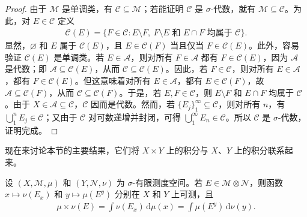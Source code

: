 \documentclass[../../main.tex]{subfiles}%
\begin{document}
\begin{proof}
由于 $\mathscr{M}$ 是单调类，有 $\mathscr{C}\subseteq\mathscr{M}$；若能证明 $\mathscr{C}$ 是 $\sigma$-代数，就有 $\mathscr{M}\subseteq\mathscr{C}$。为此，对 $E\in\mathscr{C}$ 定义
\begin{align*}
\mathscr{C}(E)=\{F\in\mathscr{C}:E\setminus F,\ F\setminus E\text{ 和 }E\cap F\text{ 均属于 }\mathscr{C}\}.
\end{align*}
显然，$\varnothing$ 和 $E$ 属于 $\mathscr{C}(E)$，且 $E\in\mathscr{C}(F)$ 当且仅当 $F\in\mathscr{C}(E)$。此外，容易验证 $\mathscr{C}(E)$ 是单调类。若 $E\in\mathscr{A}$，则对所有 $F\in\mathscr{A}$ 都有 $F\in\mathscr{C}(E)$，因为 $\mathscr{A}$ 是代数；即 $\mathscr{A}\subseteq\mathscr{C}(E)$，从而 $\mathscr{C}\subseteq\mathscr{C}(E)$。因此，若 $F\in\mathscr{C}$，则对所有 $E\in\mathscr{A}$，都有 $F\in\mathscr{C}(E)$。但这意味着对所有 $E\in\mathscr{A}$，都有 $E\in\mathscr{C}(F)$，故 $\mathscr{A}\subseteq\mathscr{C}(F)$，从而 $\mathscr{C}\subseteq\mathscr{C}(F)$。于是，若 $E,F\in\mathscr{C}$，则 $E\setminus F$ 和 $E\cap F$ 均属于 $\mathscr{C}$。由于 $X\in\mathscr{A}\subseteq\mathscr{C}$，$\mathscr{C}$ 因而是代数。然而，若 $\{E_j\}_1^\infty\subseteq\mathscr{C}$，则对所有 $n$，有 $\bigcup_1^n E_j\in\mathscr{C}$；又由于 $\mathscr{C}$ 对可数递增并封闭，可得 $\bigcup_1^\infty E_n\in\mathscr{C}$。所以 $\mathscr{C}$ 是 $\sigma$-代数，证明完成。
\end{proof}
现在来讨论本节的主要结果，它们将 $X\times Y$ 上的积分与 $X$、$Y$ 上的积分联系起来。
\begin{theorem}\label{theorem:ch02-product-section-integral}
设 $(X,\mathscr{M},\mu)$ 和 $(Y,\mathscr{N},\nu)$ 为 $\sigma$-有限测度空间。若 $E\in\mathscr{M}\otimes\mathscr{N}$，则函数 $x\mapsto\nu(E_x)$ 和 $y\mapsto\mu(E^y)$ 分别在 $X$ 和 $Y$ 上可测，且
\begin{align*}
\mu\times\nu(E)=\int\nu(E_x)\,\mathrm{d}\mu(x)=\int\mu(E^y)\,\mathrm{d}\nu(y).
\end{align*}
\end{theorem}
\end{document}
